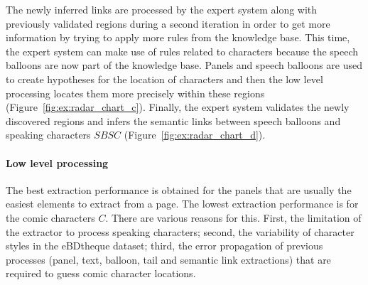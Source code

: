 The newly inferred links are processed by the expert system along with previously validated regions during a second iteration in order to get more information by trying to apply more rules from the knowledge base.
This time, the expert system can make use of rules related to characters because the speech balloons are now part of the knowledge base.
Panels and speech balloons are used to create hypotheses for the location of characters and then the low level processing locates them more precisely within these regions (Figure~\ref{fig:ex:radar_chart_c}).
Finally, the expert system validates the newly discovered regions and infers the semantic links between speech balloons and speaking characters $SBSC$ (Figure~\ref{fig:ex:radar_chart_d}).



\paragraph{Low level processing} %
\label{par:low_level_processing}

The best extraction performance is obtained for the panels that are usually the easiest elements to extract from a page.
The lowest extraction performance is for the comic characters $C$.
There are various reasons for this.
First, the limitation of the extractor to process speaking characters; second, the variability of character styles in the eBDtheque dataset; third, the error propagation of previous processes (panel, text, balloon, tail and semantic link extractions) that are required to guess comic character locations.

